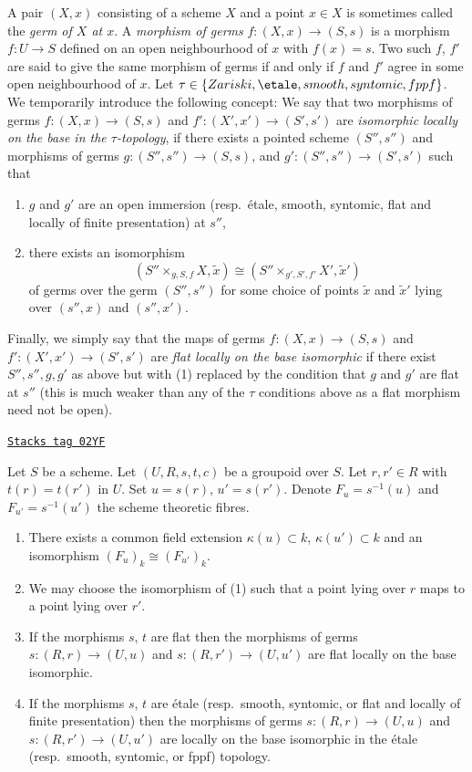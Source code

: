 \medskip\noindent
A pair $(X, x)$ consisting of a scheme $X$ and a point $x \in X$ is sometimes
called the {\it germ of $X$ at $x$}.
A {\it morphism of germs} $f : (X, x) \to (S, s)$
is a morphism $f : U \to S$ defined on an open neighbourhood
of $x$ with $f(x) = s$. Two such
$f$, $f'$ are said to give the same morphism of germs
if and only if $f$ and $f'$ agree in some open neighbourhood of $x$.
Let $\tau \in \{Zariski, \etale, smooth, syntomic, fppf\}$.
We temporarily introduce the following concept: We say that two morphisms
of germs $f : (X, x) \to (S, s)$ and $f' : (X', x') \to (S', s')$
are {\it isomorphic locally on the base in the $\tau$-topology},
if there exists a pointed scheme $(S'', s'')$ and morphisms of germs
$g : (S'', s'') \to (S, s)$, and $g' : (S'', s'') \to (S', s')$
such that
\begin{enumerate}
\item $g$ and $g'$ are an open immersion (resp.\ \'etale, smooth, syntomic,
flat and locally of finite presentation) at $s''$,
\item there exists an isomorphism
$$
(S'' \times_{g, S, f} X, \tilde x)
\cong
(S'' \times_{g', S', f'} X', \tilde  x')
$$
of germs over the germ $(S'', s'')$ for some choice of points
$\tilde x$ and $\tilde x'$ lying over $(s'', x)$ and $(s'', x')$.
\end{enumerate}
Finally, we simply say that the maps of germs
$f : (X, x) \to (S, s)$ and $f' : (X', x') \to (S', s')$
are {\it flat locally on the base isomorphic} if there exist
$S'', s'', g, g'$ as above but with (1) replaced by
the condition that $g$ and $g'$ are flat at $s''$ (this is
much weaker than any of the $\tau$ conditions above
as a flat morphism need not be open).

\begin{lemma}
\label{more-groupoids-lemma-two-fibres}
\href{https://stacks.math.columbia.edu/tag/02YF}{\texttt{Stacks tag 02YF}}

Let $S$ be a scheme.
Let $(U, R, s, t, c)$ be a groupoid over $S$.
Let $r, r' \in R$ with $t(r) = t(r')$ in $U$.
Set $u = s(r)$, $u' = s(r')$.
Denote $F_u = s^{-1}(u)$ and $F_{u'} = s^{-1}(u')$ the scheme
theoretic fibres.
\begin{enumerate}
\item There exists a common field extension
$\kappa(u) \subset k$, $\kappa(u') \subset k$ and
an isomorphism $(F_u)_k \cong (F_{u'})_k$.
\item We may choose the isomorphism of (1) such that a point
lying over $r$ maps to a point lying over $r'$.
\item If the morphisms $s$, $t$ are flat then the morphisms of germs
$s : (R, r) \to (U, u)$ and $s : (R, r') \to (U, u')$ are flat
locally on the base isomorphic.
\item If the morphisms $s$, $t$ are \'etale
(resp.\ smooth, syntomic, or flat and locally of finite presentation)
then the morphisms of germs $s : (R, r) \to (U, u)$ and
$s : (R, r') \to (U, u')$ are locally on the base isomorphic
in the \'etale (resp.\ smooth, syntomic, or fppf) topology.
\end{enumerate}
\end{lemma}

